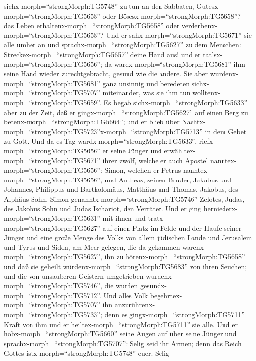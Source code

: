 sichx-morph=``strongMorph:TG5748'' zu tun an den Sabbaten,
Gutesx-morph=``strongMorph:TG5658'' oder
Bösesx-morph=``strongMorph:TG5658''? das Leben
erhaltenx-morph=``strongMorph:TG5658'' oder
verderbenx-morph=``strongMorph:TG5658''?  Und er
sahx-morph=``strongMorph:TG5671'' sie alle umher an und
sprachx-morph=``strongMorph:TG5627'' zu dem Menschen:
Streckex-morph=``strongMorph:TG5657'' deine Hand aus! und er
tat'sx-morph=``strongMorph:TG5656''; da
wardx-morph=``strongMorph:TG5681'' ihm seine Hand wieder
zurechtgebracht, gesund wie die andere.  Sie aber
wurdenx-morph=``strongMorph:TG5681'' ganz unsinnig und beredeten
sichx-morph=``strongMorph:TG5707'' miteinander, was sie ihm tun
wolltenx-morph=``strongMorph:TG5659''.  Es begab
sichx-morph=``strongMorph:TG5633'' aber zu der Zeit, daß er
gingx-morph=``strongMorph:TG5627'' auf einen Berg zu
betenx-morph=``strongMorph:TG5664''; und er blieb über
Nachtx-morph=``strongMorph:TG5723''x-morph=``strongMorph:TG5713'' in dem
Gebet zu Gott.  Und da es Tag
wardx-morph=``strongMorph:TG5633'', riefx-morph=``strongMorph:TG5656''
er seine Jünger und erwähltex-morph=``strongMorph:TG5671'' ihrer zwölf,
welche er auch Apostel nanntex-morph=``strongMorph:TG5656'':
 Simon, welchen er Petrus
nanntex-morph=``strongMorph:TG5656'', und Andreas, seinen Bruder,
Jakobus und Johannes, Philippus und Bartholomäus,  Matthäus
und Thomas, Jakobus, des Alphäus Sohn, Simon
genanntx-morph=``strongMorph:TG5746'' Zelotes,  Judas, des
Jakobus Sohn und Judas Ischariot, den Verräter.  Und er
ging herniederx-morph=``strongMorph:TG5631'' mit ihnen und
tratx-morph=``strongMorph:TG5627'' auf einen Platz im Felde und der
Haufe seiner Jünger und eine große Menge des Volks von allem jüdischen
Lande und Jerusalem und Tyrus und Sidon, am Meer gelegen, 
die da gekommen warenx-morph=``strongMorph:TG5627'', ihn zu
hörenx-morph=``strongMorph:TG5658'' und daß sie geheilt
würdenx-morph=``strongMorph:TG5683'' von ihren Seuchen; und die von
unsauberen Geistern umgetrieben wurdenx-morph=``strongMorph:TG5746'',
die wurden gesundx-morph=``strongMorph:TG5712''.  Und alles
Volk begehrtex-morph=``strongMorph:TG5707'' ihn
anzurührenx-morph=``strongMorph:TG5733''; denn es
gingx-morph=``strongMorph:TG5711'' Kraft von ihm und er
heiltex-morph=``strongMorph:TG5711'' sie alle.  Und er
hobx-morph=``strongMorph:TG5660'' seine Augen auf über seine Jünger und
sprachx-morph=``strongMorph:TG5707'': Selig seid ihr Armen; denn das
Reich Gottes istx-morph=``strongMorph:TG5748'' euer.  Selig
